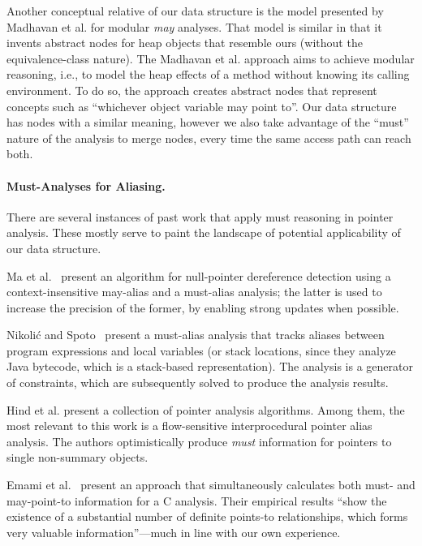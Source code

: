 Another conceptual relative of our data structure is the model
presented by Madhavan et al. \cite{article:2015:Madhavan} for modular \emph{may}
analyses. That model is similar in that it invents abstract nodes for
heap objects that resemble ours (without the equivalence-class
nature). The Madhavan et al. approach aims to achieve modular
reasoning, i.e., to model the heap effects of a method without knowing
its calling environment. To do so, the approach creates abstract
nodes that represent concepts such as ``whichever object variable
 may point to''. Our data structure has nodes with a similar
meaning, however we also take advantage of the ``must'' nature of
the analysis to merge nodes, every time the same access path can
reach both.


\paragraph{Must-Analyses for Aliasing.}
There are several instances of past work that apply must reasoning in
pointer analysis. These mostly serve to paint the landscape of
potential applicability of our data structure.

Ma et al.~\cite{isola:2008:Ma} present an algorithm for
null-pointer dereference detection using a context-insensitive
may-alias and a must-alias analysis; the latter is used to increase
the precision of the former, by enabling strong updates when possible.

Nikoli\'{c} and Spoto~\cite{ictac:2012:Nikolic} present a
must-alias analysis that tracks aliases between program expressions
and local variables (or stack locations, since they analyze Java
bytecode, which is a stack-based representation).  The analysis is a
generator of constraints, which are subsequently solved to produce the
analysis results.

Hind et al. \cite{article:1999:Hind} present a collection of pointer
analysis algorithms. Among them, the most relevant to this work is a
flow-sensitive interprocedural pointer alias analysis. The authors
optimistically produce \emph{must} information for pointers to single
non-summary objects.

Emami et al.~\cite{pldi:1994:Emami} present an approach that
simultaneously calculates both must- and may-point-to information for
a C analysis. Their empirical results ``show the existence of a
substantial number of definite points-to relationships, which forms
very valuable information''---much in line with our own
experience.

